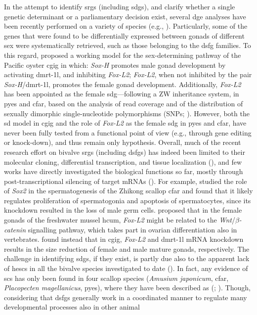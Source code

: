 In the attempt to identify \glspl{srg} (including \glspl{sdg}), and clarify whether a single genetic determinant or a parliamentary decision exist, several \gls{dge} analyses have been recently performed on a variety of species (e.g., ). Particularly, some of the genes that were found to be differentially expressed between gonads of different sex were systematically retrieved, such as those belonging to the \gls{dsfg} families. To this regard,  proposed a working model for the sex-determining pathway of the Pacific oyster \gls{cgig} in which: \textit{Sox-H} promotes male gonad development by activating \gls{dmrt-1l}, and inhibiting \textit{Fox-L2}; \textit{Fox-L2}, when not inhibited by the pair \textit{Sox-H}/\gls{dmrt-1l}, promotes the female gonad development. Additionally, \textit{Fox-L2} has been appointed as the female \gls{sdg}---following a ZW inheritance system, in \gls{pyes} and \gls{cfar}, based on the analysis of read coverage and of the distribution of sexually dimorphic single-nucleotide polymorphisms (SNPs; ). However, both the \gls{sd} model in \gls{cgig} and the role of \textit{Fox-L2} as the female \gls{sdg} in \gls{pyes} and \gls{cfar}, have never been fully tested from a functional point of view (e.g., through gene editing or knock-down), and thus remain only hypothesis. Overall, much of the recent research effort on bivalve \glspl{srg} (including \glspl{dsfg}) has indeed been limited to their molecular cloning, differential transcription, and tissue localization (), and few works have directly investigated the biological functions so far, mostly through post-transcriptional silencing of target mRNAs (). For example,  studied the role of \textit{Sox2} in the spermatogenesis of the Zhikong scallop \gls{cfar} and found that it likely regulates proliferation of spermatogonia and apoptosis of spermatocytes, since its knockdown resulted in the loss of male germ cells.  proposed that in the female gonads of the freshwater mussel \gls{hcum}, \textit{Fox-L2} might be related to the \textit{Wnt}/\textit{$\beta$-catenin} signalling pathway, which takes part in ovarian differentiation also in vertebrates.  found instead that in \gls{cgig}, \textit{Fox-L2} and \gls{dmrt-1l} mRNA knockdown results in the size reduction of female and male mature gonads, respectively. The challenge in identifying \glspl{sdg}, if they exist, is partly due also to the apparent lack of \glspl{hesc} in all the bivalve species investigated to date (). In fact, any evidence of \glspl{sc} has only been found in four scallop species (\textit{Amusium japonicum}, \gls{cfar}, \textit{Placopecten magellanicus}, \gls{pyes}), where they have been described as  (; ). Though, considering that \glspl{dsfg} generally work in a coordinated manner to regulate many developmental processes also in other animal 